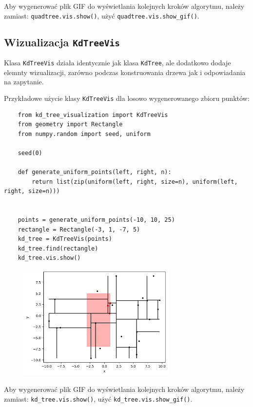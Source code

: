 \documentclass[11pt]{scrartcl}
\begin{document}
Aby wygenerować plik GIF do wyświetlania kolejnych kroków algorytmu, należy zamiast:
\texttt{quadtree.vis.show()}, użyć \texttt{quadtree.vis.show\_gif()}.

\newpage

\subsection{Wizualizacja \texttt{KdTreeVis}}
Klasa \texttt{KdTreeVis} działa identycznie jak klasa \texttt{KdTree}, ale dodatkowo dodaje elemnty wizualizacji, zarówno podczas konstruowania drzewa jak i odpowiadania na zapytanie.

Przykładowe użycie klasy \texttt{KdTreeVis} dla losowo wygenerowanego zbioru punktów:

\begin{verbatim}
    from kd_tree_visualization import KdTreeVis
    from geometry import Rectangle
    from numpy.random import seed, uniform

    seed(0)

    def generate_uniform_points(left, right, n):
        return list(zip(uniform(left, right, size=n), uniform(left, right, size=n)))
    

    points = generate_uniform_points(-10, 10, 25)
    rectangle = Rectangle(-3, 1, -7, 5)
    kd_tree = KdTreeVis(points)
    kd_tree.find(rectangle)
    kd_tree.vis.show()
\end{verbatim}

\begin{figure}[H]
    \centering
    \includegraphics[width=0.7\textwidth]{images/kd_tree_vis}
\end{figure}

Aby wygenerować plik GIF do wyświetlania kolejnych kroków algorytmu, należy zamiast:
\texttt{kd\_tree.vis.show()}, użyć \texttt{kd\_tree.vis.show\_gif()}.
\end{document}
